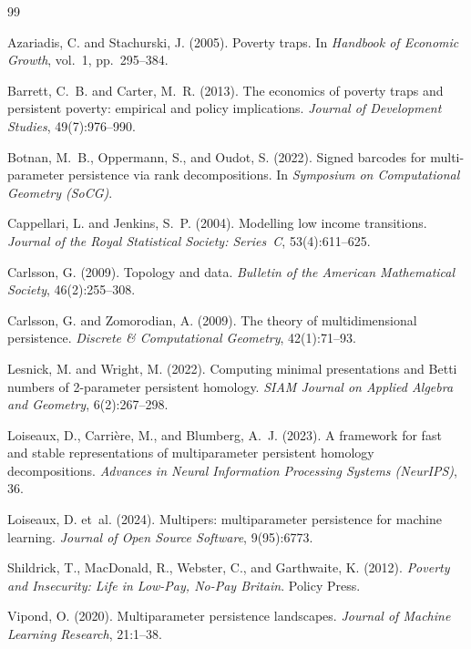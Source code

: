 \begin{thebibliography}{99}

Azariadis, C. and Stachurski, J. (2005).
\newblock Poverty traps.
\newblock In \emph{Handbook of Economic Growth}, vol.~1, pp.~295--384.

Barrett, C.~B. and Carter, M.~R. (2013).
\newblock The economics of poverty traps and persistent poverty: empirical
  and policy implications.
\newblock \emph{Journal of Development Studies}, 49(7):976--990.

Botnan, M.~B., Oppermann, S., and Oudot, S. (2022).
\newblock Signed barcodes for multi-parameter persistence via rank
  decompositions.
\newblock In \emph{Symposium on Computational Geometry (SoCG)}.

Cappellari, L. and Jenkins, S.~P. (2004).
\newblock Modelling low income transitions.
\newblock \emph{Journal of the Royal Statistical Society: Series~C},
  53(4):611--625.

Carlsson, G. (2009).
\newblock Topology and data.
\newblock \emph{Bulletin of the American Mathematical Society},
  46(2):255--308.

Carlsson, G. and Zomorodian, A. (2009).
\newblock The theory of multidimensional persistence.
\newblock \emph{Discrete \& Computational Geometry}, 42(1):71--93.

Lesnick, M. and Wright, M. (2022).
\newblock Computing minimal presentations and {B}etti numbers of 2-parameter
  persistent homology.
\newblock \emph{SIAM Journal on Applied Algebra and Geometry},
  6(2):267--298.

Loiseaux, D., Carri\`{e}re, M., and Blumberg, A.~J. (2023).
\newblock A framework for fast and stable representations of multiparameter
  persistent homology decompositions.
\newblock \emph{Advances in Neural Information Processing Systems (NeurIPS)},
  36.

Loiseaux, D. et~al. (2024).
\newblock Multipers: multiparameter persistence for machine learning.
\newblock \emph{Journal of Open Source Software}, 9(95):6773.

Shildrick, T., MacDonald, R., Webster, C., and Garthwaite, K. (2012).
\newblock \emph{Poverty and Insecurity: Life in Low-Pay, No-Pay Britain}.
\newblock Policy Press.

Vipond, O. (2020).
\newblock Multiparameter persistence landscapes.
\newblock \emph{Journal of Machine Learning Research}, 21:1--38.

\end{thebibliography}
